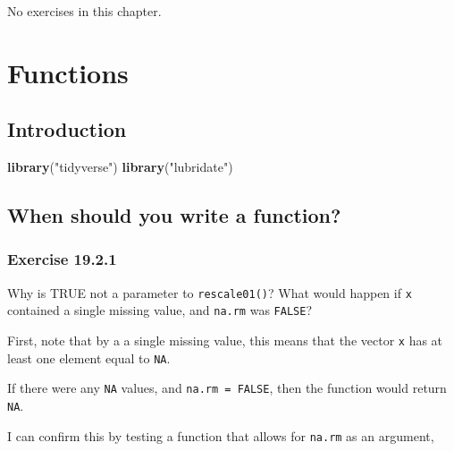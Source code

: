 \documentclass[]{book}
\newenvironment{Shaded}{\begin{snugshade}}{\end{snugshade}}
\newcommand{\KeywordTok}[1]{\textcolor[rgb]{0.13,0.29,0.53}{\textbf{#1}}}
\newcommand{\NormalTok}[1]{#1}
\newcommand{\StringTok}[1]{\textcolor[rgb]{0.31,0.60,0.02}{#1}}
\theoremstyle{plain}
\theoremstyle{remark}
\begin{document}
No exercises in this chapter.

\hypertarget{functions}{%
\chapter{Functions}\label{functions}}

\hypertarget{introduction-12}{%
\section{Introduction}\label{introduction-12}}

\begin{Shaded}
\begin{Highlighting}[]
\KeywordTok{library}\NormalTok{(}\StringTok{"tidyverse"}\NormalTok{)}
\KeywordTok{library}\NormalTok{(}\StringTok{"lubridate"}\NormalTok{)}
\end{Highlighting}
\end{Shaded}

\hypertarget{when-should-you-write-a-function}{%
\section{When should you write a
function?}\label{when-should-you-write-a-function}}

\hypertarget{exercise-19.2.1}{%
\subsection*{\texorpdfstring{Exercise
{19.2.1}}{Exercise 19.2.1}}\label{exercise-19.2.1}}

Why is TRUE not a parameter to \texttt{rescale01()}? What would happen
if \texttt{x} contained a single missing value, and \texttt{na.rm} was
\texttt{FALSE}?

First, note that by a a single missing value, this means that the vector
\texttt{x} has at least one element equal to \texttt{NA}.

If there were any \texttt{NA} values, and \texttt{na.rm\ =\ FALSE}, then
the function would return \texttt{NA}.

I can confirm this by testing a function that allows for \texttt{na.rm}
as an argument,
\end{document}

